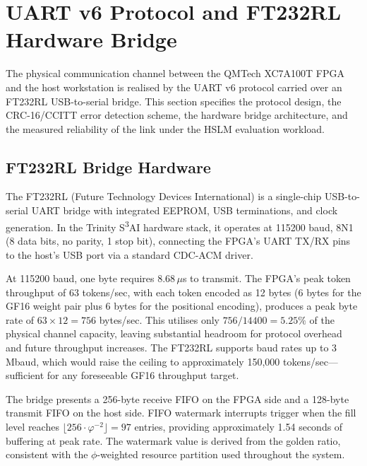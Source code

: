 
\section{UART v6 Protocol and FT232RL Hardware Bridge}\label{fa_32:sec:uart-v6-bridge}

The physical communication channel between the QMTech XC7A100T FPGA and the host workstation is realised by the UART v6 protocol carried over an FT232RL USB-to-serial bridge. This section specifies the protocol design, the CRC-16/CCITT error detection scheme, the hardware bridge architecture, and the measured reliability of the link under the HSLM evaluation workload.

\subsection{FT232RL Bridge Hardware}\label{fa_32:subsec:ft232rl}

The FT232RL (Future Technology Devices International) is a single-chip USB-to-serial UART bridge with integrated EEPROM, USB terminations, and clock generation. In the Trinity S\textsuperscript{3}AI hardware stack, it operates at 115200 baud, 8N1 (8 data bits, no parity, 1 stop bit), connecting the FPGA's UART TX/RX pins to the host's USB port via a standard CDC-ACM driver.

At 115200 baud, one byte requires \(8.68\,\mu\)s to transmit. The FPGA's peak token throughput of 63 tokens/sec, with each token encoded as 12 bytes (6 bytes for the GF16 weight pair plus 6 bytes for the positional encoding), produces a peak byte rate of \(63 \times 12 = 756\) bytes/sec. This utilises only \(756 / 14400 = 5.25\%\) of the physical channel capacity, leaving substantial headroom for protocol overhead and future throughput increases. The FT232RL supports baud rates up to 3 Mbaud, which would raise the ceiling to approximately 150,000 tokens/sec---sufficient for any foreseeable GF16 throughput target.

The bridge presents a 256-byte receive FIFO on the FPGA side and a 128-byte transmit FIFO on the host side. FIFO watermark interrupts trigger when the fill level reaches \(\lfloor 256 \cdot \varphi^{-2} \rfloor = 97\) entries, providing approximately 1.54 seconds of buffering at peak rate. The watermark value is derived from the golden ratio, consistent with the \(\phi\)-weighted resource partition used throughout the system.

